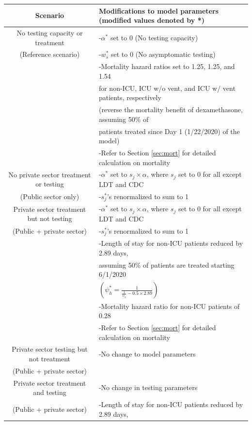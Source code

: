 \documentclass{article}
\begin{document}
\begin{table}
\begin{center}
\begin{tabular}{|c|l|}
\hline
Scenario & \makecell{Modifications to model parameters \\ (modified values denoted by *)} \\
\hline
No testing capacity or treatment & -$\alpha^*$ set to 0 (No testing capacity) \\
(Reference scenario) & -$w_s^*$ set to 0 (No asymptomatic testing) \\
 & -Mortality hazard ratios set to 1.25, 1.25, and 1.54 \\
 & for non-ICU, ICU w/o vent, and ICU w/ vent patients, respectively \\
 & (reverse the mortality benefit of dexamethasone, assuming 50\% of \\
 & patients treated since Day 1 (1/22/2020) of the model) \\
 & -Refer to Section \ref{sec:mort} for detailed calculation on mortality \\
\hline
No private sector treatment or testing & -$\alpha^*$ set to $s_j \times \alpha$, where $s_j$ set to 0 for all except LDT and CDC \\
(Public sector only) & -$s_j^*$'s renormalized to sum to 1 \\
\hline
Private sector treatment but not testing & -$\alpha^*$ set to $s_j \times \alpha$, where $s_j$ set to 0 for all except LDT and CDC \\
(Public + private sector) & -$s_j^*$'s renormalized to sum to 1 \\
 & -Length of stay for non-ICU patients reduced by 2.89 days, \\
 & assuming 50\% of patients are treated starting 6/1/2020 \\
 & $\left(\psi_h^* = \frac{1}{\frac{1}{\psi_h} - 0.5\times2.89}\right)$ \\
 & -Mortality hazard ratio for non-ICU patients of 0.28 \\
 & -Refer to Section \ref{sec:mort} for detailed calculation on mortality \\
\hline
Private sector testing but not treatment & -No change to model parameters \\
(Public + private sector) & \\
\hline
Private sector treatment and testing & -No change in testing parameters \\
(Public + private sector) & -Length of stay for non-ICU patients reduced by 2.89 days, \\

\end{tabular}
\end{center}
\end{table}
\end{document}
